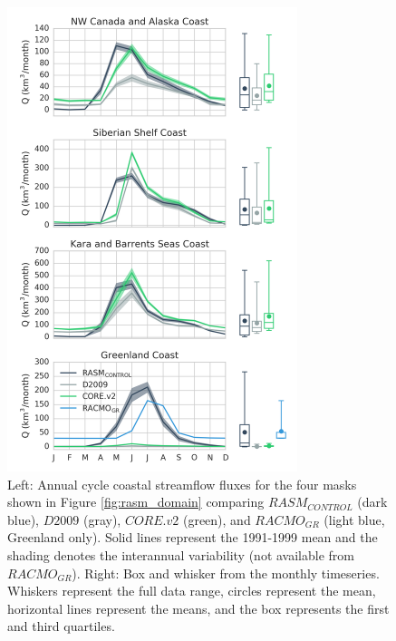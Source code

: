 \documentclass[jgrga, draft]{agutex}
\begin{document}
\clearpage
\begin{figure}
\noindent\includegraphics[width=20pc,natwidth=1]{coastal_hydrographs}
\caption{Left: Annual cycle coastal streamflow fluxes for the four masks shown in Figure \ref{fig:rasm_domain} comparing $RASM_{CONTROL}$ (dark blue), $D2009$ (gray), $CORE.v2$ (green), and $RACMO_{GR}$ (light blue, Greenland only).
Solid lines represent the 1991-1999 mean and the shading denotes the interannual variability (not available from $RACMO_{GR}$).
Right: Box and whisker from the monthly timeseries.
Whiskers represent the full data range, circles represent the mean, horizontal lines represent the means, and the box represents the first and third quartiles.
}
\label{fig:coastal_hydrographs}
\end{figure}
\end{document}
